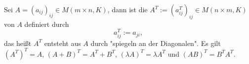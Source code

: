 \begin{definition}
	\label{def:I.9.5}
	Sei $A = (a_{ij})_{ij} \in M(m \times n,K)$, dann ist die  $A^T := (a_{ij}^T)_{ij} \in M(n \times m,K)$ von $A$ definiert durch
	\[
		a_{ij}^T := a_{ji},
	\]
	das heißt $A^T$ entsteht aus $A$ durch "spiegeln an der Diagonalen".
	Es gilt $(A^T)^T = A$, $(A+B)^T = A^T + B^T$, $(\lambda A)^T = \lambda A^T$ und $(AB)^T = B^T A^T$.
\end{definition}
\newpage